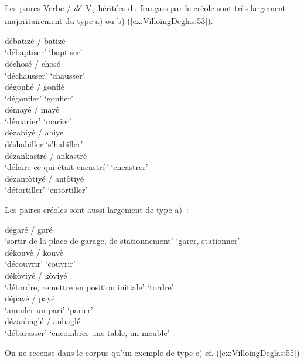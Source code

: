 \documentclass[output=paper]{langsci/langscibook}
\begin{document}
Les paires Verbe / \emph{dé}--V\textsubscript{v} héritées du français par le
créole sont très largement majoritairement du type a) ou b) (\ref{ex:VilloingDeglas:53}).


  \ea \label{ex:VilloingDeglas:53}
        \ea \gll débatizé / batizé\\
          {`débaptiser'} {} {`baptiser'}\\
        \ex \gll  déchosé / chosé\\
          {`déchausser'} {} {`chausser'}\\
        \ex \gll  dégonflé / gonflé\\
          {`dégonfler'} {} {`gonfler'}\\
        \ex \gll  démayé / mayé\\
          {`démarier'} {} {`marier'}\\
        \ex \gll  dézabiyé  / abiyé\\
          déshabiller {} {`s'habiller'}\\
        \ex \gll  dézankastré / ankastré\\
          {`défaire ce qui était encastré'} {} {`encastrer'}\\
        \ex \gll  dézantòtiyé / antòtiyé\\
          {`détortiller'} {} {`entortiller'}\\
  \z\z


Les paires créoles sont aussi largement de type a)~:

\ea \label{ex:VilloingDeglas:54}
      \ea \gll dégaré  / garé\\
  {`sortir de la place de garage, de stationnement'} {} {`garer, stationner'}\\
      \ex \gll  dékouvè / kouvè\\
        {`découvrir'} {} {`couvrir'}\\
      \ex \gll  dékòviyé / kòviyé\\
        {`détordre, remettre en position initiale'} {} {`tordre'}\\
      \ex \gll  dépayé / payé\\
        {`annuler un pari'} {} {`parier'}\\
      \ex \gll  dézanbaglé / anbaglé\\
        {`débarasser'} {} {`encombrer une table, un meuble'}\\
\z\z


On ne recense dans le corpus qu'un exemple de type c) cf. (\ref{ex:VilloingDeglas:55})
\end{document}
